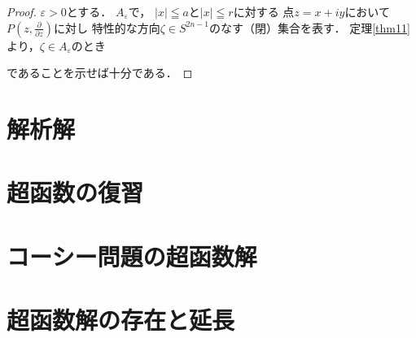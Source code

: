 \begin{proof}
    \(\varepsilon>0\)とする．
    \(A_{\varepsilon}\)で，
    \(\lvert x\rvert\leqq a\)と\(\lvert x\rvert\leqq r\)に対する
    点\(z=x+iy\)において\(P(z,\frac{\partial}{\partial z})\)に対し
    特性的な方向\(\zeta\in S^{2n-1}\)のなす（閉）集合を表す．
    定理\ref{thm11}より，\(\zeta\in A_{\varepsilon}\)のとき


    であることを示せば十分である．
\end{proof}
\section{解析解}

\section{超函数の復習}

\section{コーシー問題の超函数解}

\section{超函数解の存在と延長}

